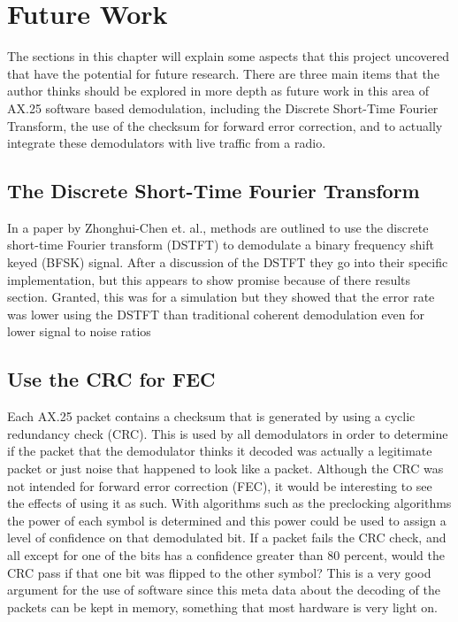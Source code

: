 \chapter{Future Work}
The sections in this chapter will explain some aspects that this project uncovered that have the potential for future research. There are three main items that the author thinks should be explored in more depth as future work in this area of AX.25 software based demodulation, including the Discrete Short-Time Fourier Transform, the use of the checksum for forward error correction, and to actually integrate these demodulators with live traffic from a radio.

\section{The Discrete Short-Time Fourier Transform}
In a paper by Zhonghui-Chen et. al., methods are outlined to use the discrete short-time Fourier transform (DSTFT) to demodulate a binary frequency shift keyed (BFSK) signal. After a discussion of the DSTFT they go into their specific implementation, but this appears to show promise because of there results section. Granted, this was for a simulation but they showed that the error rate was lower using the DSTFT than traditional coherent demodulation even for lower signal to noise ratios\,\cite{Chen2008}

\section{Use the CRC for FEC}
Each AX.25 packet contains a checksum that is generated by using a cyclic redundancy check (CRC). This is used by all demodulators in order to determine if the packet that the demodulator thinks it decoded was actually a legitimate packet or just noise that happened to look like a packet. Although the CRC was not intended for forward error correction (FEC), it would be interesting to see the effects of using it as such. With algorithms such as the preclocking algorithms the power of each symbol is determined and this power could be used to assign a level of confidence on that demodulated bit. If a packet fails the CRC check, and all except for one of the bits has a confidence greater than 80 percent, would the CRC pass if that one bit was flipped to the other symbol? This is a very good argument for the use of software since this meta data about the decoding of the packets can be kept in memory, something that most hardware is very light on. 

